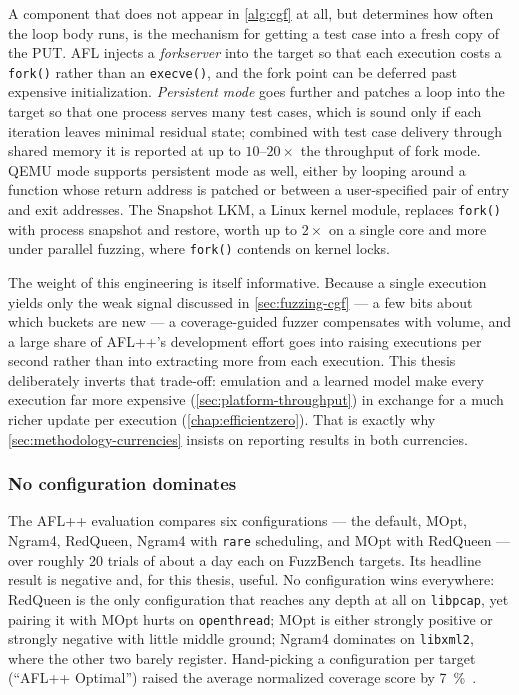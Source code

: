 A component that does not appear in \cref{alg:cgf} at all, but determines how often the
loop body runs, is the mechanism for getting a test case into a fresh copy of the PUT.
AFL injects a \emph{forkserver} into the target so that each execution costs a
\texttt{fork()} rather than an \texttt{execve()}, and the fork point can be deferred past
expensive initialization.
\emph{Persistent mode} goes further and patches a loop into the target so that one process
serves many test cases, which is sound only if each iteration leaves minimal residual
state; combined with test case delivery through shared memory it is reported at up to
$10\text{--}20\times$ the throughput of fork mode.
QEMU mode supports persistent mode as well, either by looping around a function whose
return address is patched or between a user-specified pair of entry and exit addresses.
The Snapshot LKM, a Linux kernel module, replaces \texttt{fork()} with process snapshot and
restore, worth up to $2\times$ on a single core and more under parallel fuzzing, where
\texttt{fork()} contends on kernel locks.

The weight of this engineering is itself informative.
Because a single execution yields only the weak signal discussed in \cref{sec:fuzzing-cgf}
--- a few bits about which buckets are new --- a coverage-guided fuzzer compensates with
volume, and a large
share of AFL++'s development effort goes into raising executions per second rather than
into extracting more from each execution.
This thesis deliberately inverts that trade-off: emulation and a learned model make every
execution far more expensive (\cref{sec:platform-throughput}) in exchange for a much richer
update per execution (\cref{chap:efficientzero}).
That is exactly why \cref{sec:methodology-currencies} insists on reporting results in both
currencies.

\subsubsection{No configuration dominates}

The AFL++ evaluation compares six configurations --- the default, MOpt, Ngram4, RedQueen,
Ngram4 with \texttt{rare} scheduling, and MOpt with RedQueen --- over roughly 20 trials of
about a day each on FuzzBench targets.
Its headline result is negative and, for this thesis, useful.
No configuration wins everywhere: RedQueen is the only configuration that reaches any depth
at all on \texttt{libpcap}, yet pairing it with MOpt hurts on \texttt{openthread}; MOpt is
either strongly positive or strongly negative with little middle ground; Ngram4 dominates
on \texttt{libxml2}, where the other two barely register.
Hand-picking a configuration per target (\enquote{AFL++ Optimal}) raised the average
normalized coverage score by \SI{7}{\percent}~\cite{fioraldi_afl_nodate}.

